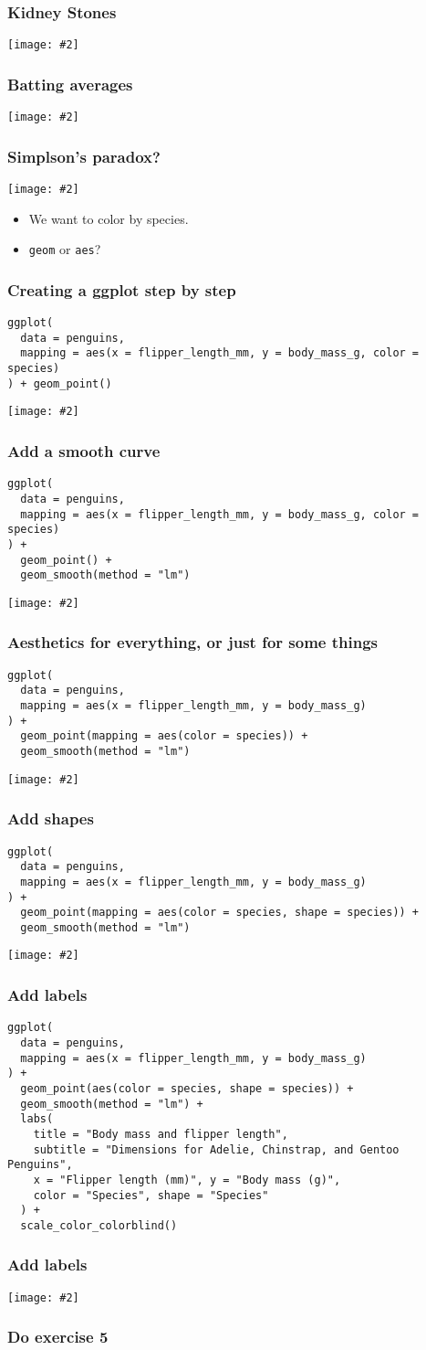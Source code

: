 \documentclass{beamer}
\newcommand{\bi}{\begin{itemize}}
\newcommand{\li}{\item}
\newcommand{\ei}{\end{itemize}}
\newcommand{\fig}[2]{\centerline{\texttt{[image: \#2]}}}
\newcommand{\bfr}[1]{\begin{frame}[fragile]\frametitle{{ #1 }}}
\begin{document}
\bfr{Kidney Stones}
\fig{1}{stones}
\end{frame}

\bfr{Batting averages}
\fig{1}{batting}
\end{frame}

\bfr{Simplson's paradox?}\scriptsize
\fig{.8}{unnamed-chunk-10-1.png}
\bi
\li We want to color by species.
\li {\tt geom} or {\tt aes}?
\ei
\end{frame}

\bfr{Creating a ggplot step by step}\scriptsize
\begin{verbatim}
ggplot(
  data = penguins,
  mapping = aes(x = flipper_length_mm, y = body_mass_g, color = species)
) + geom_point()
\end{verbatim}
\fig{.8}{unnamed-chunk-11-1.png}

\end{frame}


\bfr{Add a smooth curve}\scriptsize
\begin{verbatim}
ggplot(
  data = penguins,
  mapping = aes(x = flipper_length_mm, y = body_mass_g, color = species)
) +
  geom_point() +
  geom_smooth(method = "lm")
\end{verbatim}
\fig{.8}{unnamed-chunk-12-1.png}

\end{frame}


\bfr{Aesthetics for everything, or just for some things}\scriptsize
\begin{verbatim}
ggplot(
  data = penguins,
  mapping = aes(x = flipper_length_mm, y = body_mass_g)
) +
  geom_point(mapping = aes(color = species)) +
  geom_smooth(method = "lm")
\end{verbatim}
\fig{.8}{unnamed-chunk-13-1.png}

\end{frame}


\bfr{Add shapes}\scriptsize
\begin{verbatim}
ggplot(
  data = penguins,
  mapping = aes(x = flipper_length_mm, y = body_mass_g)
) +
  geom_point(mapping = aes(color = species, shape = species)) +
  geom_smooth(method = "lm")
\end{verbatim}
\fig{.8}{unnamed-chunk-14-1.png}

\end{frame}


\bfr{Add labels}\scriptsize
\begin{verbatim}
ggplot(
  data = penguins,
  mapping = aes(x = flipper_length_mm, y = body_mass_g)
) +
  geom_point(aes(color = species, shape = species)) +
  geom_smooth(method = "lm") +
  labs(
    title = "Body mass and flipper length",
    subtitle = "Dimensions for Adelie, Chinstrap, and Gentoo Penguins",
    x = "Flipper length (mm)", y = "Body mass (g)",
    color = "Species", shape = "Species"
  ) +
  scale_color_colorblind()
\end{verbatim}
\end{frame}
\bfr{Add labels}
\fig{1}{unnamed-chunk-15-1.png}

\end{frame}

\bfr{Do exercise 5}
\end{frame}
\end{document}
